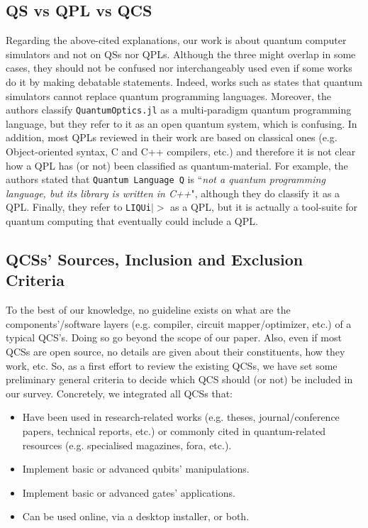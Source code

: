 \documentclass[conference]{IEEEtran}
\begin{document}
\subsection{QS vs QPL vs QCS}

Regarding the above-cited explanations, our work is about quantum computer simulators and not on QSs nor QPLs. Although the three might overlap in some cases, they should not be confused nor interchangeably used even if some works do it by making debatable statements. Indeed, works such as \cite{ref_3} states that quantum simulators cannot replace quantum programming languages. Moreover, the authors classify \texttt{QuantumOptics.jl} as a multi-paradigm quantum programming language, but they refer to it as an open quantum system, which is confusing. In addition, most QPLs reviewed in their work are based on classical ones (e.g. Object-oriented syntax, C and C++ compilers, etc.) and therefore it is not clear how a QPL has (or not) been classified as quantum-material. For example, the authors stated that \texttt{Quantum Language Q} is ``\emph{not a quantum programming language, but its library is written in C++}", although they do classify it as a QPL. Finally, they refer to \texttt{LIQUi$|\!>$} as a QPL, but it is actually a tool-suite for quantum computing that eventually could include a QPL. 

\subsection{QCSs' Sources, Inclusion and Exclusion Criteria \label{sec:exc_inc}}

To the best of our knowledge, no guideline exists on what are the components'/software layers (e.g. compiler, circuit mapper/optimizer, etc.) of a typical QCS's. Doing so go beyond the scope of our paper. Also, even if most QCSs are open source, no details are given about their constituents, how they work, etc. So, as a first effort to review the existing QCSs, we have set some preliminary general criteria to decide which QCS should (or not) be included in our survey. Concretely, we integrated all QCSs that: 

\begin{itemize}
	\item Have been used in research-related works (e.g. theses, journal/conference papers, technical reports, etc.) or commonly cited in quantum-related resources (e.g. specialised magazines, fora, etc.).
	\item Implement basic or advanced qubits' manipulations.
	\item Implement basic or advanced gates' applications.
	\item Can be used online, via a desktop installer, or both.
\end{itemize}
\end{document}
